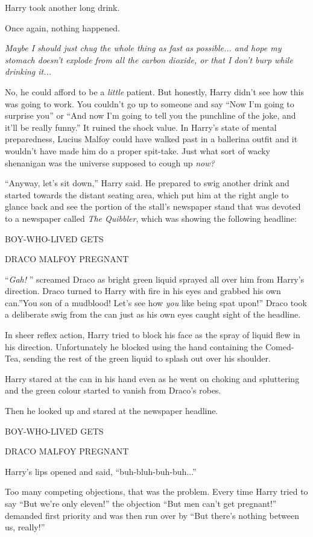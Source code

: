 Harry took another long drink.

Once again, nothing happened.

\emph{Maybe I should just chug the whole thing as fast as
possible... and hope my stomach doesn't explode from all the carbon
dioxide, or that I don't burp while drinking it...}

No, he could afford to be a \emph{little} patient. But honestly, Harry
didn't see how this was going to work. You couldn't go up to someone and
say ``Now I'm going to surprise you'' or ``And now I'm going to tell you
the punchline of the joke, and it'll be really funny.'' It ruined the
shock value. In Harry's state of mental preparedness, Lucius Malfoy
could have walked past in a ballerina outfit and it wouldn't have made
him do a proper spit-take. Just what sort of wacky shenanigan was the
universe supposed to cough up \emph{now?}

``Anyway, let's sit down,'' Harry said. He prepared to swig another
drink and started towards the distant seating area, which put him at the
right angle to glance back and see the portion of the stall's newspaper
stand that was devoted to a newspaper called \emph{The Quibbler}, which
was showing the following headline:

BOY-WHO-LIVED GETS

DRACO MALFOY PREGNANT

``\emph{Gah!} '' screamed Draco as bright green liquid sprayed all over
him from Harry's direction. Draco turned to Harry with fire in his eyes
and grabbed his own can.''You son of a mudblood! Let's see how
\emph{you} like being spat upon!'' Draco took a deliberate swig from the
can just as his own eyes caught sight of the headline.

In sheer reflex action, Harry tried to block his face as the spray of
liquid flew in his direction. Unfortunately he blocked using the hand
containing the Comed-Tea, sending the rest of the green liquid to splash
out over his shoulder.

Harry stared at the can in his hand even as he went on choking and
spluttering and the green colour started to vanish from Draco's robes.

Then he looked up and stared at the newspaper headline.

BOY-WHO-LIVED GETS

DRACO MALFOY PREGNANT

Harry's lips opened and said, ``buh-bluh-buh-buh...''

Too many competing objections, that was the problem. Every time Harry
tried to say ``But we're only eleven!'' the objection ``But men can't
get pregnant!'' demanded first priority and was then run over by ``But
there's nothing between us, really!''

